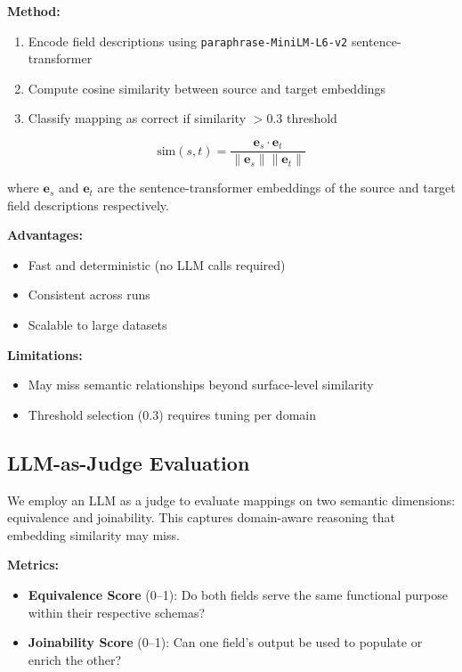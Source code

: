 \documentclass[sigconf, nonacm]{acmart}
\begin{document}
\textbf{Method:}
\begin{enumerate}
    \item Encode field descriptions using \texttt{paraphrase-MiniLM-L6-v2} sentence-transformer
    \item Compute cosine similarity between source and target embeddings
    \item Classify mapping as correct if similarity $> 0.3$ threshold
\end{enumerate}

\begin{equation}
\text{sim}(s, t) = \frac{\mathbf{e}_s \cdot \mathbf{e}_t}{\|\mathbf{e}_s\| \|\mathbf{e}_t\|}
\end{equation}

where $\mathbf{e}_s$ and $\mathbf{e}_t$ are the sentence-transformer embeddings of the source and target field descriptions respectively.

\textbf{Advantages:}
\begin{itemize}
    \item Fast and deterministic (no LLM calls required)
    \item Consistent across runs
    \item Scalable to large datasets
\end{itemize}

\textbf{Limitations:}
\begin{itemize}
    \item May miss semantic relationships beyond surface-level similarity
    \item Threshold selection (0.3) requires tuning per domain
\end{itemize}

\subsection{LLM-as-Judge Evaluation}

We employ an LLM as a judge to evaluate mappings on two semantic dimensions: equivalence and joinability. This captures domain-aware reasoning that embedding similarity may miss.

\textbf{Metrics:}
\begin{itemize}
    \item \textbf{Equivalence Score} (0--1): Do both fields serve the same functional purpose within their respective schemas?
    \item \textbf{Joinability Score} (0--1): Can one field's output be used to populate or enrich the other?
\end{itemize}
\end{document}
